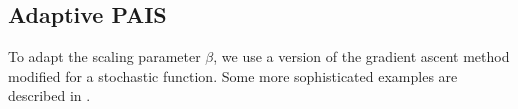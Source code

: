 \documentclass[final]{siamltex}
\begin{document}

\subsection{Adaptive PAIS}\label{sec:adapt}


To adapt the scaling parameter $\beta$, we use a version of the
gradient ascent method modified for a stochastic function. Some more
sophisticated examples are described in
\cite{roberts2009examples,Ji2013adaptive,andrieu2006ergodicity}.

\end{document}
